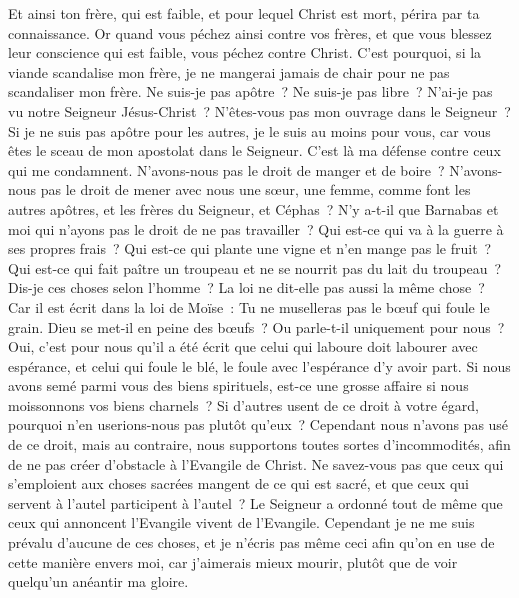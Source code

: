\begin{multicols}{2}
Et ainsi ton frère, qui est faible, et pour lequel Christ est mort, périra par ta connaissance.
Or quand vous péchez ainsi contre vos frères, et que vous blessez leur conscience qui est faible, vous péchez contre Christ.
C'est pourquoi, si la viande scandalise mon frère, je ne mangerai jamais de chair pour ne pas scandaliser mon frère.
\VerseOne{}Ne suis-je pas apôtre~? Ne suis-je pas libre~? N'ai-je pas vu notre Seigneur Jésus-Christ~? N'êtes-vous pas mon ouvrage dans le Seigneur~?
Si je ne suis pas apôtre pour les autres, je le suis au moins pour vous, car vous êtes le sceau de mon apostolat dans le Seigneur.
C'est là ma défense contre ceux qui me condamnent.
N'avons-nous pas le droit de manger et de boire~?
N'avons-nous pas le droit de mener avec nous une sœur, une femme, comme font les autres apôtres, et les frères du Seigneur, et Céphas~?
N'y a-t-il que Barnabas et moi qui n'ayons pas le droit de ne pas travailler~?
Qui est-ce qui va à la guerre à ses propres frais~? Qui est-ce qui plante une vigne et n'en mange pas le fruit~? Qui est-ce qui fait paître un troupeau et ne se nourrit pas du lait du troupeau~?
Dis-je ces choses selon l'homme~? La loi ne dit-elle pas aussi la même chose~?
Car il est écrit dans la loi de Moïse~: Tu ne muselleras pas le bœuf qui foule le grain. Dieu se met-il en peine des bœufs~?
Ou parle-t-il uniquement pour nous~? Oui, c'est pour nous qu'il a été écrit que celui qui laboure doit labourer avec espérance, et celui qui foule le blé, le foule avec l'espérance d'y avoir part.
Si nous avons semé parmi vous des biens spirituels, est-ce une grosse affaire si nous moissonnons vos biens charnels~?
Si d'autres usent de ce droit à votre égard, pourquoi n'en userions-nous pas plutôt qu'eux~? Cependant nous n'avons pas usé de ce droit, mais au contraire, nous supportons toutes sortes d'incommodités, afin de ne pas créer d'obstacle à l'Evangile de Christ.
Ne savez-vous pas que ceux qui s'emploient aux choses sacrées mangent de ce qui est sacré, et que ceux qui servent à l'autel participent à l'autel~?
Le Seigneur a ordonné tout de même que ceux qui annoncent l'Evangile vivent de l'Evangile.
Cependant je ne me suis prévalu d'aucune de ces choses, et je n'écris pas même ceci afin qu'on en use de cette manière envers moi, car j'aimerais mieux mourir, plutôt que de voir quelqu'un anéantir ma gloire.

\end{multicols}
